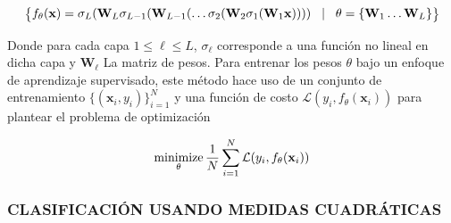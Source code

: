 \begin{equation}
    \footnotesize 
    \big\{f_\theta(\mathbf{x}) = \sigma_{L}(\mathbf{W}_{L}\sigma_{L-1}(\mathbf{W}_{L-1} (\dots \sigma_2(\mathbf{W}_2\sigma_1(\mathbf{W}_1\mathbf{x})))) \quad \vert \quad\theta = \{\mathbf{W}_{1} \dots \mathbf{W}_{L}\}  \big\}
\end{equation}

Donde para cada capa $1 \leq \ell \leq L$, $\sigma_\ell$ corresponde a una función no lineal en dicha capa y $\mathbf{W}_\ell$ La matriz de pesos. Para entrenar los pesos $\theta$ bajo un enfoque de aprendizaje supervisado, este método hace uso de un conjunto de entrenamiento $\{(\mathbf{x}_i, y_i) \}_{i=1}^{N}$ y una función de costo $\mathcal{L}( y_i,  f_\theta(\mathbf{x}_i))$ para plantear el problema de optimización

\begin{equation}
    \operatorname*{minimize}_\theta \frac{1}{N}\sum_{i=1}^{N} \mathcal{L}( y_i,  f_\theta(\mathbf{x}_i))
\end{equation}

\subsubsection{CLASIFICACIÓN USANDO MEDIDAS CUADRÁTICAS}
\pagebreak